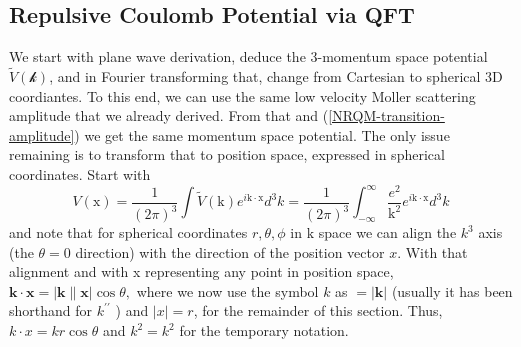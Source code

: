 \subsection{Repulsive Coulomb Potential via QFT}
We start with plane wave derivation, deduce the 3-momentum space potential $\tilde{V}(\mathcal{k})$, and in Fourier transforming that, change from Cartesian to spherical 3D coordiantes. To this end, we can use the same low velocity Moller scattering amplitude that we already derived. From that and (\ref{NRQM-transition-amplitude}) we get the same momentum space potential. The only issue remaining is to transform that to position space, expressed in spherical coordinates. Start with
\begin{equation}V(\mathrm{x})=\frac{1}{(2 \pi)^{3}} \int \tilde{V}(\mathrm{k}) e^{i \mathrm{k} \cdot \mathrm{x}} d^{3} k=\frac{1}{(2 \pi)^{3}} \int_{-\infty}^{\infty} \frac{e^{2}}{\mathrm{k}^{2}} e^{i \mathrm{k} \cdot \mathrm{x}} d^{3} k\end{equation}
and note that for spherical coordinates $r, \theta, \phi$ in $\mathrm{k}$ space we can align the $k^{3}$ axis (the $\theta=0$ direction) with the direction of the position vector $x$. With that alignment and with x representing any point in position space, $\mathbf{k} \cdot \mathbf{x}=|\mathbf{k} \| \mathbf{x}| \cos \theta,$ where we now use the symbol $k$ as $=|\mathbf{k}|$ (usually it has been shorthand for $k^{\prime \prime}$ ) and $|x|=r$, for the remainder of this section. Thus, $k \cdot x=k r \cos \theta$ and $k^{2}=k^{2}$ for the temporary notation.

